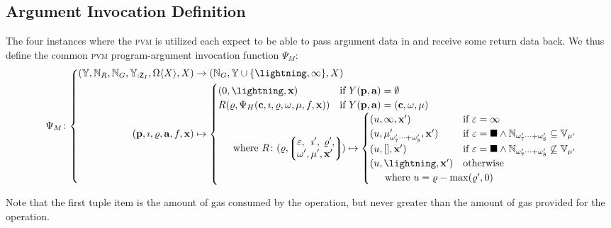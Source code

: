 \subsection{Argument Invocation Definition}

The four instances where the \textsc{pvm} is utilized each expect to be able to pass argument data in and receive some return data back. We thus define the common \textsc{pvm} program-argument invocation function $\Psi_M$:
\begin{equation}
  \Psi_M\colon \left\{\begin{aligned}
    \left(
      \Y, \N_R, \N_G, \Y_{:\mathsf{Z}_I}, \Omega\langle X \rangle, X
    \right) &\to (\N_G, \Y \cup \{\panic, \oog\}, X)\\
    (\mathbf{p}, \imath, \gascounter, \mathbf{a}, f, \mathbf{x}) &\mapsto \begin{cases}
      (0, \panic, \mathbf{x}) &\when Y(\mathbf{p}, \mathbf{a}) = \none\\
      R(\gascounter, \Psi_H(\mathbf{c}, \imath, \gascounter, \registers, \mem, f, \mathbf{x})) &\when Y(\mathbf{p}, \mathbf{a}) = (\mathbf{c}, \registers, \mem)\\
      \multicolumn{2}{l}{
        \quad \where R \colon (\gascounter, \tup{\begin{alignedat}{5}
          &\varepsilon,\, &&\imath',\, &&\gascounter',\\
          &\registers',\, &&\mem',\, &&\mathbf{x}'
        \end{alignedat}
        }) \mapsto \begin{cases}
          (u, \oog, \mathbf{x}') &\when \varepsilon = \oog \\
          (u, \memory'_{\registers'_{7}\dots+\registers'_{8}}, \mathbf{x}') &\when \varepsilon = \halt \wedge \mathbb{N}_{\registers'_{7}\dots+\registers'_{8}} \subseteq \mathbb{V}_{\mem'} \\
          (u, [], \mathbf{x}') &\when \varepsilon = \halt \wedge \mathbb{N}_{\registers'_{7}\dots+\registers'_{8}} \not\subseteq \mathbb{V}_{\mem'} \\
          (u, \panic, \mathbf{x}') &\otherwise \\
          \multicolumn{2}{l}{\quad \where u = \gascounter - \max(\gascounter', 0)}
        \end{cases}
      }\!\!\!\!\!\!\!\!
    \end{cases}
  \end{aligned}\right.
\end{equation}

Note that the first tuple item is the amount of gas consumed by the operation, but never greater than the amount of gas provided for the operation.
